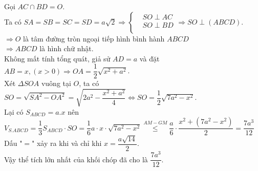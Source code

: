 \begin{ex}
{\begin{center}
		\end{center}
		Gọi $AC\cap BD=O$.\\
		Ta có $SA=SB=SC=SD=a\sqrt{2}\Rightarrow\left\{\begin{aligned}
			& SO\perp AC\\ 
			& SO\perp BD\\ 
		\end{aligned}\right.\Rightarrow SO\perp\left(ABCD\right)$.\\
		$\Rightarrow O$ là tâm đường tròn ngoại tiếp hình bình hành $ ABCD$\\
		$\Rightarrow ABCD$ là hình chữ nhật.\\
		Không mất tính tổng quát, giả sử $ AD=a$ và đặt $ AB=x,\left(x>0\right)\Rightarrow OA=\dfrac{1}{2}\sqrt{x^2+a^2}$.\\
		Xét $\Delta SOA$ vuông tại $ O$, ta có $ SO=\sqrt{S{A^2}-O{A^2}}=\sqrt{2a^2-\dfrac{x^2+a^2}{4}}\Leftrightarrow SO=\dfrac{1}{2}\sqrt{7a^2-x^2}$.\\
		Lại có $S_{ABCD}=a.x$ nên 
		$V_{S.ABCD}=\dfrac{1}{3}{S_{ABCD}}\cdot SO=\dfrac{1}{6}a\cdot x\cdot \sqrt{7a^2-x^2}\overset{AM-GM}{\mathop{\le}}\dfrac{a}{6}\cdot\dfrac{x^2+\left(7a^2-x^2\right)}{2}=\dfrac{7a^3}{12}$\\
		Dấu "$=$" xảy ra khi và chỉ khi $x=\dfrac{a\sqrt{14}}{2}$.\\
		Vậy thể tích lớn nhất của khối chóp đã cho là $\dfrac{7a^3}{12}$.	
	}
\end{ex}

